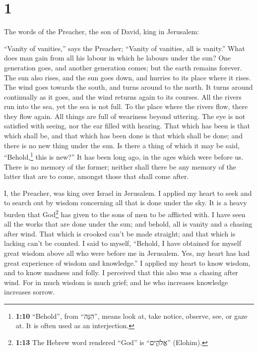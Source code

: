 \hypertarget{section}{%
\section{1}\label{section}}

 The words of the Preacher, the son of David, king in
Jerusalem:

 ``Vanity of vanities,'' says the Preacher; ``Vanity of
vanities, all is vanity.''  What does man gain from all
his labour in which he labours under the sun?  One
generation goes, and another generation comes; but the earth remains
forever.  The sun also rises, and the sun goes down, and
hurries to its place where it rises.  The wind goes
towards the south, and turns around to the north. It turns around
continually as it goes, and the wind returns again to its courses.
 All the rivers run into the sea, yet the sea is not full.
To the place where the rivers flow, there they flow again.
 All things are full of weariness beyond uttering. The eye
is not satisfied with seeing, nor the ear filled with hearing.
 That which has been is that which shall be, and that
which has been done is that which shall be done; and there is no new
thing under the sun.  Is there a thing of which it may be
said, ``Behold,\footnote{\textbf{1:10} ``Behold'', from ``הִנֵּה'',
  means look at, take notice, observe, see, or gaze at. It is often used
  as an interjection.} this is new?'' It has been long ago, in the ages
which were before us.  There is no memory of the former;
neither shall there be any memory of the latter that are to come,
amongst those that shall come after.

 I, the Preacher, was king over Israel in Jerusalem.
 I applied my heart to seek and to search out by wisdom
concerning all that is done under the sky. It is a heavy burden that
God\footnote{\textbf{1:13} The Hebrew word rendered ``God'' is
  ``אֱלֹהִ֑ים'' (Elohim).} has given to the sons of men to be afflicted
with.  I have seen all the works that are done under the
sun; and behold, all is vanity and a chasing after wind. 
That which is crooked can't be made straight; and that which is lacking
can't be counted.  I said to myself, ``Behold, I have
obtained for myself great wisdom above all who were before me in
Jerusalem. Yes, my heart has had great experience of wisdom and
knowledge.''  I applied my heart to know wisdom, and to
know madness and folly. I perceived that this also was a chasing after
wind.  For in much wisdom is much grief; and he who
increases knowledge increases sorrow.


